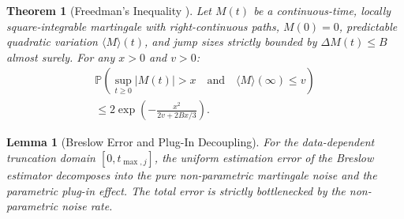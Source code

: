 \documentclass[letterpaper, 10 pt, conference]{IEEEconf}
\newtheorem{theorem}{Theorem}
\newtheorem{lemma}{Lemma}
\begin{document}
\begin{theorem}[Freedman's Inequality {\cite{vandegeer1995, dzhaparidze2001}}]
    \label{thm:freedman}
    Let $M(t)$ be a continuous-time, locally square-integrable martingale with right-continuous paths, $M(0) = 0$, predictable quadratic variation $\langle M \rangle(t)$, and jump sizes strictly bounded by $\Delta M(t) \le B$ almost surely. For any $x > 0$ and $v > 0$:
    \begin{multline}
        \mathbb{P} \left( \sup_{t \ge 0} |M(t)| > x \quad \text{and} \quad \langle M \rangle(\infty) \le v \right) \\
        \le 2\exp\left( - \frac{x^2}{2v + 2Bx/3} \right).
    \end{multline}
\end{theorem}

\begin{lemma}[Breslow Error and Plug-In Decoupling]
    \label{lem:breslow_plugin}
    For the data-dependent truncation domain $[0, t_{\max, j}]$, the uniform estimation error of the Breslow estimator decomposes into the pure non-parametric martingale noise and the parametric plug-in effect. The total error is strictly bottlenecked by the non-parametric noise rate.
\end{lemma}
\end{document}

